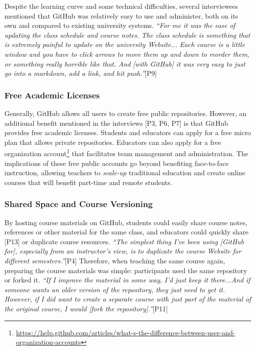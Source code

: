 Despite the learning curve and some technical difficulties, several interviewees mentioned that GitHub was relatively easy to use and administer, both on its own and compared to existing university systems. \textit{``For me it was the ease of updating the class schedule and course notes. The class schedule is something that is extremely painful to update on the university Website... Each course is a little window and you have to click arrows to move them up and down to reorder them, or something really horrible like that. And [with GitHub] it was very easy to just go into a markdown, add a link, and hit push.''}[P9]

\subsubsection{Free Academic Licenses}

Generally, GitHub allows all users to create free public repositories. However, an additional benefit mentioned in the interviews [P3, P6, P7] is that GitHub provides free academic licenses. Students and educators can apply for a free micro plan that allows private repositories. Educators can also apply for a free organization account\footnote{\url{https://help.github.com/articles/what-s-the-difference-between-user-and-organization-accounts}} that facilitates team management and administration. The implications of these free public accounts go beyond benefiting face-to-face instruction, allowing teachers to \textit{scale-up} traditional education and create online courses that will benefit part-time and remote students.

\subsubsection{Shared Space and Course Versioning}
By hosting course materials on GitHub, students could easily share course notes, references or other material for the same class, and educators could quickly share [P13] or duplicate course resources. \textit{``The simplest thing I've been using [GitHub for], especially from an instructor's view, is to duplicate the course Website for different semesters.''}[P4] Therefore, when teaching the same course again, preparing the course materials was simple: participants used the same repository or forked it. \textit{``If I improve the material in some way, I'd just keep it there...And if someone wants an older version of the repository, they just need to get it. However, if I did want to create a separate course with just part of the material of the original course, I would [fork the repository].''}[P11]

